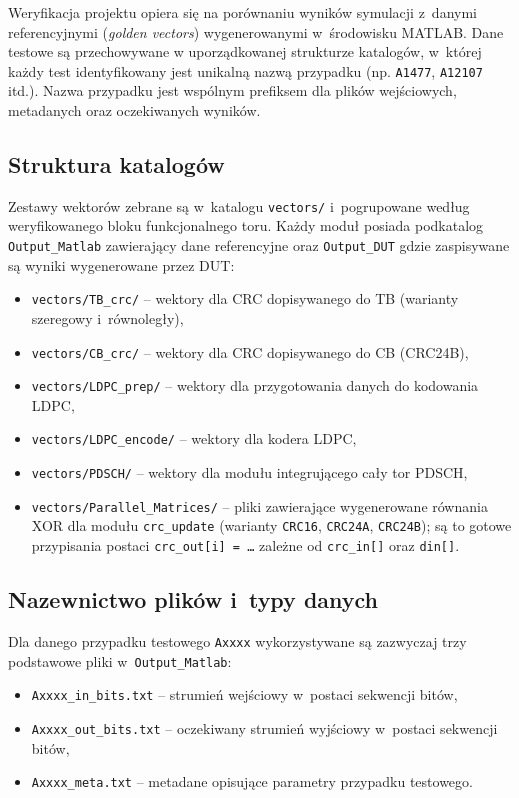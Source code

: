 Weryfikacja projektu opiera się na porównaniu wyników symulacji z~danymi referencyjnymi
(\emph{golden vectors}) wygenerowanymi w~środowisku MATLAB. Dane testowe są przechowywane
w uporządkowanej strukturze katalogów, w~której każdy test identyfikowany jest unikalną nazwą
przypadku (np. \texttt{A1477}, \texttt{A12107} itd.). Nazwa przypadku jest wspólnym prefiksem
dla plików wejściowych, metadanych oraz oczekiwanych wyników.

\subsection{Struktura katalogów}
\label{subsec:wektory_struktura_katalogow}

Zestawy wektorów zebrane są w~katalogu \texttt{vectors/} i~pogrupowane według weryfikowanego bloku funkcjonalnego toru. Każdy moduł posiada podkatalog \texttt{Output\_Matlab} zawierający dane referencyjne oraz \texttt{Output\_DUT} gdzie zaspisywane są wyniki wygenerowane przez DUT:

\begin{itemize}
    \item \texttt{vectors/TB\_crc/} -- wektory dla CRC dopisywanego do TB (warianty szeregowy i~równoległy),
    \item \texttt{vectors/CB\_crc/} -- wektory dla CRC dopisywanego do CB (CRC24B),
    \item \texttt{vectors/LDPC\_prep/} -- wektory dla przygotowania danych do kodowania LDPC,
    \item \texttt{vectors/LDPC\_encode/} -- wektory dla kodera LDPC,
    \item \texttt{vectors/PDSCH/} -- wektory dla modułu integrującego cały tor PDSCH,
    \item \texttt{vectors/Parallel\_Matrices/} -- pliki zawierające wygenerowane równania XOR dla modułu \texttt{crc\_update} (warianty \texttt{CRC16}, \texttt{CRC24A}, \texttt{CRC24B}); są to gotowe przypisania postaci \texttt{crc\_out[i] = \ldots} zależne od \texttt{crc\_in[]} oraz \texttt{din[]}.


\end{itemize}

\subsection{Nazewnictwo plików i~typy danych}
\label{subsec:wektory_typy_plikow}

Dla danego przypadku testowego \texttt{Axxxx} wykorzystywane są zazwyczaj trzy podstawowe
pliki w~\texttt{Output\_Matlab}:
\begin{itemize}
    \item \texttt{Axxxx\_in\_bits.txt} -- strumień wejściowy w~postaci sekwencji bitów,
    \item \texttt{Axxxx\_out\_bits.txt} -- oczekiwany strumień wyjściowy w~postaci sekwencji bitów,
    \item \texttt{Axxxx\_meta.txt} -- metadane opisujące parametry przypadku testowego.
\end{itemize}

